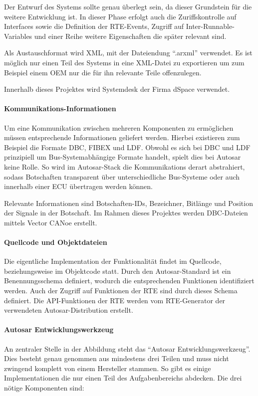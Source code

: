 \documentclass[
  a4paper,					    %
  twoside,
  DIV=calc,     				%
  bibliography=totoc,
  cleardoublepage=empty,
  ngerman,     					%
  final       					%
]{scrbook}
\begin{document}
Der Entwurf des Systems sollte genau überlegt sein, da dieser Grundstein für die weitere Entwicklung ist. In dieser Phase erfolgt auch die Zuriffskontrolle auf Interfaces sowie die Definition der RTE-Events, Zugriff auf Inter-Runnable-Variables und einer Reihe weitere Eigenschaften die später relevant sind.

Als Austauschformat wird XML, mit der Dateiendung "`.arxml"' verwendet. Es ist möglich nur einen Teil des Systems in eine XML-Datei zu exportieren um zum Beispiel einem OEM nur die für ihn relevante Teile offenzulegen.

Innerhalb dieses Projektes wird Systemdesk der Firma dSpace verwendet.

\paragraph{Kommunikations-Informationen}
Um eine Kommunikation zwischen mehreren Komponenten zu ermöglichen müssen entsprechende Informationen geliefert werden. Hierbei existieren zum Beispiel die Formate DBC, FIBEX und LDF. Obwohl es sich bei DBC und LDF prinzipiell um Bus-Systemabhängige Formate handelt, spielt dies bei Autosar keine Rolle. So wird im Autosar-Stack die Kommunikations derart abstrahiert, sodass Botschaften transparent über unterschiedliche Bus-Systeme oder auch innerhalb einer ECU übertragen werden können.

Relevante Informationen sind Botschaften-IDs, Bezeichner, Bitlänge und Position der Signale in der Botschaft. Im Rahmen dieses Projektes werden DBC-Dateien mittels Vector CANoe erstellt.

\paragraph{Quellcode und Objektdateien}
Die eigentliche Implementation der Funktionalität findet im Quellcode, beziehungsweise im Objektcode statt. Durch den Autosar-Standard ist ein Benennungsschema definiert, wodurch die entsprechenden Funktionen identifiziert werden. Auch der Zugriff auf Funktionen der RTE sind durch dieses Schema definiert. Die API-Funktionen der RTE werden vom RTE-Generator der verwendeten Autosar-Distribution erstellt.



\paragraph{Autosar Entwicklungswerkzeug}
An zentraler Stelle in der Abbildung steht das "`Autosar Entwicklungswerkzeug"'. Dies besteht genau genommen aus mindestens drei Teilen und muss nicht zwingend komplett von einem Hersteller stammen. So gibt es einige Implementationen die nur einen Teil des Aufgabenbereichs abdecken. Die drei nötige Komponenten sind:
\end{document}

